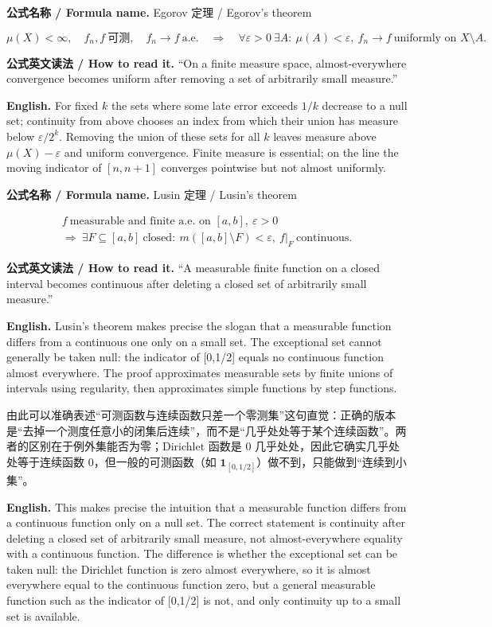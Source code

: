 \documentclass[UTF8,11pt,a4paper]{ctexart}
\newcommand{\EN}[1]{\par\noindent\textbf{English.} #1\par}
\newcommand{\READ}[1]{\par\noindent\textbf{公式英文读法 / How to read it.} #1\par}
\newcommand{\FORMULA}[2]{\par\Needspace{3\baselineskip}\noindent\textbf{公式名称 / Formula name.} #1 / #2\par}
\begin{document}
\FORMULA{Egorov 定理}{Egorov's theorem}
\[
\mu(X)<\infty,\quad f_n,f\ \text{可测},\quad f_n\to f\ \text{a.e.}
\quad\Longrightarrow\quad
\forall\varepsilon>0\ \exists A:\ \mu(A)<\varepsilon,\ f_n\to f\ \text{uniformly on }X\setminus A.
\]
\READ{“On a finite measure space, almost-everywhere convergence becomes uniform after removing a set of arbitrarily small measure.”}
\EN{For fixed $k$ the sets where some late error exceeds $1/k$ decrease to a null set; continuity from above chooses an index from which their union has measure below $\varepsilon/2^k$. Removing the union of these sets for all $k$ leaves measure above $\mu(X)-\varepsilon$ and uniform convergence. Finite measure is essential; on the line the moving indicator of $[n,n+1]$ converges pointwise but not almost uniformly.}
\FORMULA{Lusin 定理}{Lusin's theorem}
\[
\begin{gathered}
f\ \text{measurable and finite a.e. on }[a,b],\ \varepsilon>0\\
\Longrightarrow\ \exists F\subseteq[a,b]\ \text{closed}:\ m([a,b]\setminus F)<\varepsilon,\ f|_F\ \text{continuous}.
\end{gathered}
\]
\READ{“A measurable finite function on a closed interval becomes continuous after deleting a closed set of arbitrarily small measure.”}
\EN{Lusin's theorem makes precise the slogan that a measurable function differs from a continuous one only on a small set. The exceptional set cannot generally be taken null: the indicator of [0,1/2] equals no continuous function almost everywhere. The proof approximates measurable sets by finite unions of intervals using regularity, then approximates simple functions by step functions.}
\noindent 由此可以准确表述“可测函数与连续函数只差一个零测集”这句直觉：正确的版本是“去掉一个测度任意小的闭集后连续”，而不是“几乎处处等于某个连续函数”。两者的区别在于例外集能否为零；Dirichlet 函数是 $0$ 几乎处处，因此它确实几乎处处等于连续函数 $0$，但一般的可测函数（如 $\mathbf1_{[0,1/2]}$）做不到，只能做到“连续到小集”。
\EN{This makes precise the intuition that a measurable function differs from a continuous function only on a null set. The correct statement is continuity after deleting a closed set of arbitrarily small measure, not almost-everywhere equality with a continuous function. The difference is whether the exceptional set can be taken null: the Dirichlet function is zero almost everywhere, so it is almost everywhere equal to the continuous function zero, but a general measurable function such as the indicator of [0,1/2] is not, and only continuity up to a small set is available.}
\end{document}
